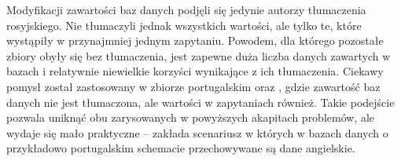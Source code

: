 Modyfikacji zawartości baz danych podjęli się jedynie autorzy tłumaczenia rosyjskiego. Nie tłumaczyli jednak wszystkich wartości, ale tylko te, które wystąpiły w przynajmniej jednym zapytaniu. Powodem, dla którego pozostałe zbiory obyły się bez tłumaczenia, jest zapewne duża liczba danych zawartych w bazach i relatywnie niewielkie korzyści wynikające z ich tłumaczenia. Ciekawy pomysł został zastosowany w zbiorze portugalskim oraz , gdzie zawartość baz danych nie jest tłumaczona, ale wartości w zapytaniach również. Takie podejście pozwala uniknąć obu zarysowanych w powyższych akapitach problemów, ale wydaje się mało praktyczne -- zakłada scenariusz w których w bazach danych o przykładowo portugalskim schemacie przechowywane są dane angielskie.
